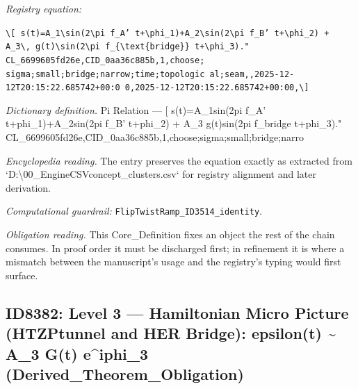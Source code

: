\documentclass[11pt]{article}
\theoremstyle{remark}
\begin{document}
\noindent\textit{Registry equation:}\par
{\small\texttt{\textbackslash{}[ s(t)=A\_1\textbackslash{}sin(2\textbackslash{}pi f\_A' t+\textbackslash{}phi\_1)+A\_2\textbackslash{}sin(2\textbackslash{}pi f\_B' t+\textbackslash{}phi\_2) + A\_3\textbackslash{}, g(t)\textbackslash{}sin(2\textbackslash{}pi f\_\{\textbackslash{}text\{bridge\}\} t+\textbackslash{}phi\_3)." CL\_6699605fd26e,CID\_0aa36c885b,1,choose; sigma;small;bridge;narrow;time;topologic al;seam,,2025-12-12T20:15:22.685742+00:0 0,2025-12-12T20:15:22.685742+00:00,\textbackslash{}]}}\par\medskip
\noindent\textit{Dictionary definition.} Pi Relation --- [ s(t)=A\_1sin(2pi f\_A' t+phi\_1)+A\_2sin(2pi f\_B' t+phi\_2) + A\_3 g(t)sin(2pi f\_bridge t+phi\_3)." CL\_6699605fd26e,CID\_0aa36c885b,1,choose;sigma;small;bridge;narro\par\medskip
\noindent\textit{Encyclopedia reading.} The entry preserves the equation exactly as extracted from `D:\textbackslash{}00\_EngineCSVconcept\_clusters.csv` for registry alignment and later derivation.
\par\medskip\noindent\textit{Computational guardrail:} \texttt{FlipTwistRamp\_ID3514\_identity}.
\par\medskip\noindent\textit{Obligation reading.} This Core\_Definition fixes an object the rest of the chain consumes. In proof order it must be discharged first; in refinement it is where a mismatch between the manuscript's usage and the registry's typing would first surface.

\subsection{ID8382: Level 3 --- Hamiltonian Micro Picture (HTZPtunnel and HER Bridge): epsilon(t) \textasciitilde{} A\_3 G(t) e\textasciicircum{}iphi\_3 (Derived\_Theorem\_Obligation)}
\end{document}
